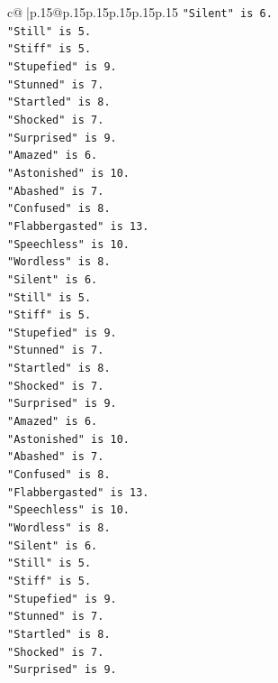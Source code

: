 \documentclass{article}
\begin{document}
{\begin{supertabular}{c@{$\;$}|p{.15\linewidth}@{}p{.15\linewidth}p{.15\linewidth}p{.15\linewidth}p{.15\linewidth}p{.15\linewidth}}
{{{\texttt{"Silent" is 6.} \\
\texttt{"Still" is 5.} \\
\texttt{"Stiff" is 5.} \\
\texttt{"Stupefied" is 9.} \\
\texttt{"Stunned" is 7.} \\
\texttt{"Startled" is 8.} \\
\texttt{"Shocked" is 7.} \\
\texttt{"Surprised" is 9.} \\
\texttt{"Amazed" is 6.} \\
\texttt{"Astonished" is 10.} \\
\texttt{"Abashed" is 7.} \\
\texttt{"Confused" is 8.} \\
\texttt{"Flabbergasted" is 13.} \\
\texttt{"Speechless" is 10.} \\
\texttt{"Wordless" is 8.} \\
\texttt{"Silent" is 6.} \\
\texttt{"Still" is 5.} \\
\texttt{"Stiff" is 5.} \\
\texttt{"Stupefied" is 9.} \\
\texttt{"Stunned" is 7.} \\
\texttt{"Startled" is 8.} \\
\texttt{"Shocked" is 7.} \\
\texttt{"Surprised" is 9.} \\
\texttt{"Amazed" is 6.} \\
\texttt{"Astonished" is 10.} \\
\texttt{"Abashed" is 7.} \\
\texttt{"Confused" is 8.} \\
\texttt{"Flabbergasted" is 13.} \\
\texttt{"Speechless" is 10.} \\
\texttt{"Wordless" is 8.} \\
\texttt{"Silent" is 6.} \\
\texttt{"Still" is 5.} \\
\texttt{"Stiff" is 5.} \\
\texttt{"Stupefied" is 9.} \\
\texttt{"Stunned" is 7.} \\
\texttt{"Startled" is 8.} \\
\texttt{"Shocked" is 7.} \\
\texttt{"Surprised" is 9.} \\
}}}
\end{supertabular}}
\end{document}
